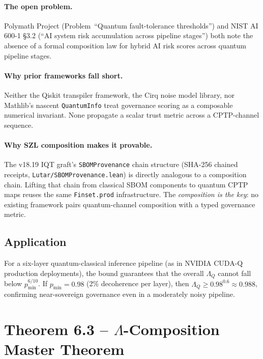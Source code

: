 \paragraph{The open problem.}
Polymath Project (Problem~``Quantum fault-tolerance thresholds'') and
NIST AI 600-1 \S{}3.2 (``AI system risk accumulation across pipeline
stages'') both note the absence of a formal composition law for
hybrid AI risk scores across quantum pipeline stages.

\paragraph{Why prior frameworks fall short.}
Neither the Qiskit transpiler framework, the Cirq noise model library,
nor Mathlib's nascent \texttt{QuantumInfo} treat governance scoring
as a composable numerical invariant.  None propagate a scalar trust
metric across a CPTP-channel sequence.

\paragraph{Why SZL composition makes it provable.}
The v18.19 IQT graft's \texttt{SBOMProvenance} chain structure
(SHA-256 chained receipts, \texttt{Lutar/SBOMProvenance.lean}) is
directly analogous to a composition chain.  Lifting that chain from
classical SBOM components to quantum CPTP maps reuses the same
\texttt{Finset.prod} infrastructure.  The \emph{composition is the
key}: no existing framework pairs quantum-channel composition with
a typed governance metric.

\subsection*{Application}

For a six-layer quantum-classical inference pipeline (as in NVIDIA
CUDA-Q production deployments), the bound guarantees that the overall
$\Lambda_Q$ cannot fall below $p_{\min}^{6/10}$.  If $p_{\min}
= 0.98$ (2\% decoherence per layer), then $\Lambda_Q \geq 0.98^{0.6}
\approx 0.988$, confirming near-sovereign governance even in a
moderately noisy pipeline.

\section{Theorem 6.3 -- $\Lambda$-Composition Master Theorem}
\label{sec:thm03}

